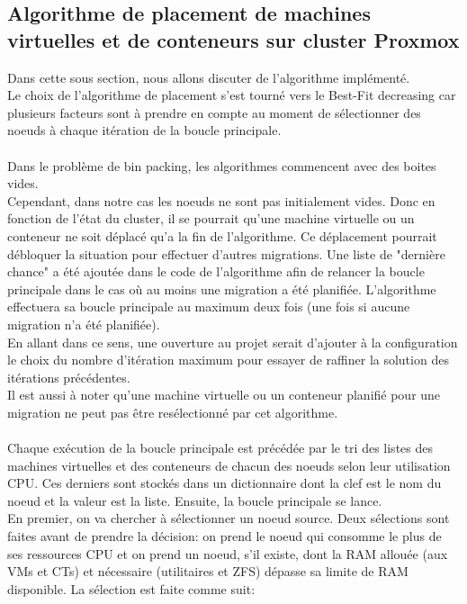 \documentclass[14pt]{extarticle}
\begin{document}
    \subsection{Algorithme de placement de machines virtuelles et de conteneurs sur cluster Proxmox}
    Dans cette sous section, nous allons discuter de l'algorithme implémenté.\\
    Le choix de l'algorithme de placement s'est tourné vers le Best-Fit decreasing car plusieurs facteurs sont à prendre en compte au moment de sélectionner des noeuds à chaque itération de la boucle principale.\\
    \\
    Dans le problème de bin packing, les algorithmes commencent avec des boites vides.\\
    Cependant, dans notre cas les noeuds ne sont pas initialement vides. Donc en fonction de l'état du cluster, il se pourrait qu'une machine virtuelle ou un conteneur ne soit déplacé qu'a la fin de l'algorithme. Ce déplacement pourrait débloquer la situation pour effectuer d'autres migrations. Une liste de "dernière chance" a été ajoutée dans le code de l'algorithme afin de relancer la boucle principale dans le cas où au moins une migration a été planifiée. L'algorithme effectuera sa boucle principale au maximum deux fois (une fois si aucune migration n'a été planifiée).\\
    En allant dans ce sens, une ouverture au projet serait d'ajouter à la configuration le choix du nombre d'itération maximum pour essayer de raffiner la solution des itérations précédentes.\\
    Il est aussi à noter qu'une machine virtuelle ou un conteneur planifié pour une migration ne peut pas être resélectionné par cet algorithme.\\
    \\
    Chaque exécution de la boucle principale est précédée par le tri des listes des machines virtuelles et des conteneurs de chacun des noeuds selon leur utilisation CPU. Ces derniers sont stockés dans un dictionnaire dont la clef est le nom du noeud et la valeur est la liste. Ensuite, la boucle principale se lance.\\
    En premier, on va chercher à sélectionner un noeud source. Deux sélections sont faites avant de prendre la décision: on prend le noeud qui consomme le plus de ses ressources CPU et on prend un noeud, s'il existe, dont la RAM allouée (aux VMs et CTs) et nécessaire (utilitaires et ZFS) dépasse sa limite de RAM disponible.
    La sélection est faite comme suit:
\end{document}

